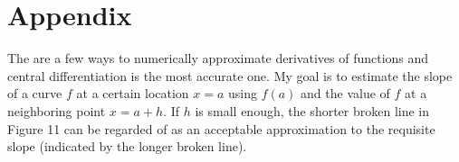 \chapter*{Appendix}

The are a few ways to numerically approximate derivatives of functions and central differentiation is the most accurate one. My goal is to estimate the slope of a curve $f$ at a certain location $x = a$ using $f(a)$ and the value of $f$ at a neighboring point $x = a + h$. If $h$ is small enough, the shorter broken line in Figure 11 can be regarded of as an acceptable approximation to the requisite slope (indicated by the longer broken line).